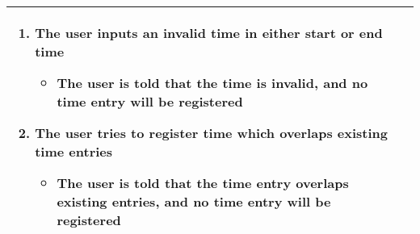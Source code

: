 \begin{table}[H]
\begin{tabular}{|l|l|}
{{\begin{enumerate}
        \item{The user inputs an invalid time in either start or end time}
          \begin{itemize}
          \item {The user is told that the time is invalid, and no time entry will be registered}
          \end{itemize}

        \item{The user tries to register time which overlaps existing time entries}
          \begin{itemize}
          \item {The user is told that the time entry overlaps existing entries, and no time entry will be registered}
          \end{itemize}

        \end{enumerate}
      }}
    \\ \hline
  \end{tabular}
\end{table}